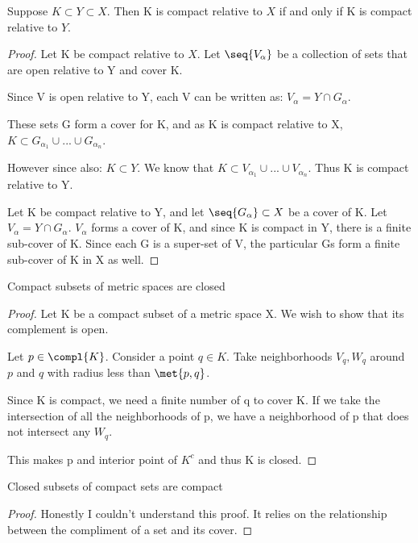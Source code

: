 \documentclass[12pt, letterpaper]{paper}
\begin{document}
\begin{theorem}
  \label{thr:3.33}
  Suppose $K \subset Y \subset X$. Then K is compact relative to $X$
  if and only if K is compact relative to $Y$.
\end{theorem}
\begin{proof}
  Let K be compact relative to $X$. Let $\seq{V_{\alpha}}$ be a
  collection of sets that are open relative to Y and cover K.

  Since V is open relative to Y, each V can be written as:
  $V_{\alpha} = Y \cap G_{\alpha}$.\par
  These sets G form a cover for K, and as K is compact relative to X,
  $K \subset G_{\alpha_1} \cup ... \cup G_{\alpha_n}$.\par
  However since also: $K \subset Y$. We know that
  $K \subset V_{\alpha_1} \cup ... \cup V_{\alpha_n}$. Thus K is
  compact relative to Y. \par
  Let K be compact relative to Y, and let $\seq{G_{\alpha}} \subset X$
  be a cover of K. Let $V_{\alpha} = Y \cap G_{\alpha}$. $V_{\alpha}$
  forms a cover of K, and since K is compact in Y, there is a finite
  sub-cover of K. Since each G is a super-set of V, the particular Gs
  form a finite sub-cover of K in X as well.
\end{proof}

\begin{theorem}
  \label{thr:2.34}
  Compact subsets of metric spaces are closed
\end{theorem}
\begin{proof}
  Let K be a compact subset of a metric space X. We wish to show that
  its complement is open. \par
  Let $p \in \compl{ K }$. Consider a point $q \in K$. Take
  neighborhoods $V_q, W_q$ around $p$ and $q$ with radius less than
  $\met{p,q}$. \par
  Since K is compact, we need a finite number of q to cover K. If we
  take the intersection of all the neighborhoods of p, we have a
  neighborhood of p that does not intersect any $W_q$.

  This makes p and interior point of $K^c$ and thus K is closed.
\end{proof}

\begin{theorem}
  \label{thr:2.35}
  Closed subsets of compact sets are compact
\end{theorem}
\begin{proof}
  Honestly I couldn't understand this proof. It relies on the
  relationship between the compliment of a set and its cover.
\end{proof}
\end{document}

